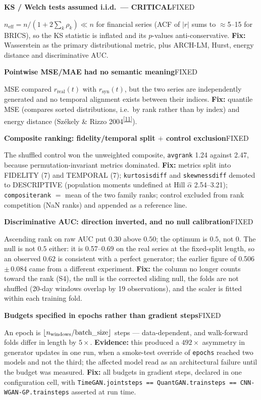 \documentclass[11pt,a4paper]{article}
\makeatletter
\newcommand{\tcite}[1]{\textsuperscript{[\hyperlink{R:#1}{#1}]}}
\DeclareRobustCommand{\_}{\ifmmode\nfss@text{\textunderscore}\else\textunderscore\allowbreak\fi}
\newcommand{\auditrow}[5]{\par\medskip\noindent\textbf{#4}\hfill{\sffamily\footnotesize\textsc{#1}}\par\nopagebreak\noindent #5\par}
\makeatother
\begin{document}
\auditrow{FIXED}{DRed}{RBg}%
  {KS / Welch tests assumed i.i.d.\ --- CRITICAL}%
  {$n_\text{eff} = n/(1+2\sum_k\rho_k) \ll n$ for financial series (ACF of $|r|$ sums to $\approx$5--15 for BRICS), so the KS statistic is inflated and its $p$-values anti-conservative. \textbf{Fix:} Wasserstein as the primary distributional metric, plus ARCH-LM, Hurst, energy distance and discriminative AUC.}

\auditrow{FIXED}{DRed}{RBg}%
  {Pointwise MSE/MAE had no semantic meaning}%
  {MSE compared $r_\text{real}(t)$ with $r_\text{syn}(t)$, but the two series are independently generated and no temporal alignment exists between their indices. \textbf{Fix:} quantile MSE (compares sorted distributions, i.e.\ by rank rather than by index) and energy distance (Sz\'{e}kely \& Rizzo 2004\tcite{11}).}

\auditrow{FIXED}{Amber}{ABg}%
  {Composite ranking: fidelity/temporal split $+$ control exclusion}%
  {The shuffled control won the unweighted composite, \texttt{avg\_rank} 1.24 against 2.47, because permutation-invariant metrics dominated. \textbf{Fix:} metrics split into FIDELITY (7) and TEMPORAL (7); \texttt{kurtosis\_diff} and \texttt{skewness\_diff} demoted to DESCRIPTIVE (population moments undefined at Hill $\hat\alpha$ 2.54--3.21); \texttt{composite\_rank} $=$ mean of the two family ranks; control excluded from rank competition (NaN ranks) and appended as a reference line.}

\auditrow{FIXED}{Amber}{ABg}%
  {Discriminative AUC: direction inverted, and no null calibration}%
  {Ascending rank on raw AUC put $0.30$ above $0.50$; the optimum is $0.5$, not $0$. The null is not $0.5$ either: it is 0.57--0.69 on the real series at the fixed-split length, so an observed $0.62$ is consistent with a perfect generator; the earlier figure of 0.506\,$\pm$\,0.084 came from a different experiment. \textbf{Fix:} the column no longer counts toward the rank (S4), the null is the corrected sliding null, the folds are not shuffled (20-day windows overlap by 19 observations), and the scaler is fitted within each training fold.}

\auditrow{FIXED}{Amber}{ABg}%
  {Budgets specified in epochs rather than gradient steps}%
  {An epoch is $\lfloor n_\text{windows}/\text{batch\_size}\rfloor$ steps --- data-dependent, and walk-forward folds differ in length by $5\times$. \textbf{Evidence:} this produced a $492\times$ asymmetry in generator updates in one run, when a smoke-test override of \texttt{epochs} reached two models and not the third; the affected model read as an architectural failure until the budget was measured. \textbf{Fix:} all budgets in gradient steps, declared in one configuration cell, with \texttt{TimeGAN.joint\_steps == QuantGAN.train\_steps == CNN-WGAN-GP.train\_steps} asserted at run time.}
\end{document}
